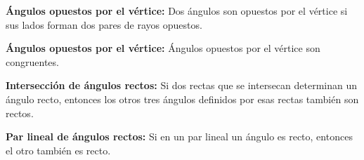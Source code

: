 \begin{definition}{\textbf{Ángulos opuestos por el vértice:}}
    Dos ángulos son opuestos por el vértice si sus lados forman dos pares de rayos opuestos.
\end{definition}

\begin{theorem}{\textbf{Ángulos opuestos por el vértice:}}
    Ángulos opuestos por el vértice son congruentes.

    \begin{figure}[!h]
        \centering
        
        \label{fig:vertex-angle}
    \end{figure}
    
\end{theorem}

\begin{theorem}{\textbf{Intersección de ángulos rectos:}}
    Si dos rectas que se intersecan determinan un ángulo recto, entonces los otros tres ángulos definidos por esas rectas también son rectos.
\end{theorem}

\begin{theorem}{\textbf{Par lineal de ángulos rectos:}}
    Si en un par lineal un ángulo es recto, entonces el otro también es recto.
\end{theorem}
